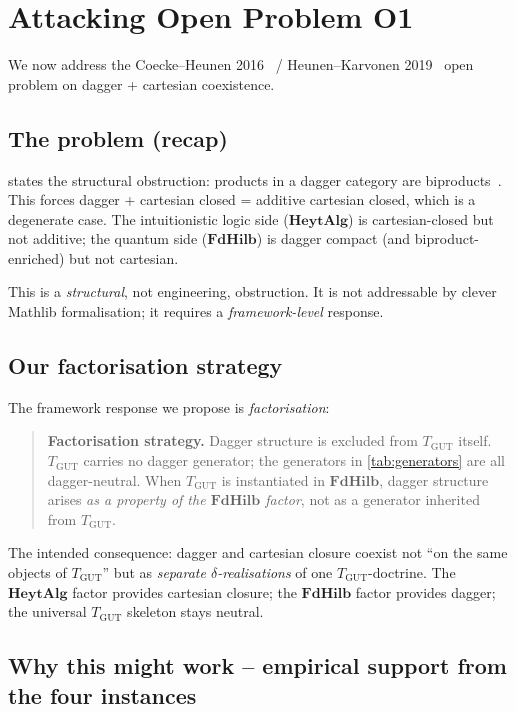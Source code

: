 \documentclass[11pt,a4paper]{article}
\theoremstyle{plain}
\theoremstyle{definition}
\theoremstyle{remark}
\newcommand{\cat}[1]{\mathbf{#1}}
\newcommand{\HeytAlg}{\cat{HeytAlg}}
\newcommand{\FdHilb}{\cat{FdHilb}}
\newcommand{\TGUT}{T_{\mathrm{GUT}}}
\begin{document}
\section{Attacking Open Problem O1}\label{sec:o1}

We now address the Coecke--Heunen 2016~\cite{CH16} / Heunen--Karvonen 2019~\cite{HK19} open problem on dagger + cartesian coexistence.

\subsection{The problem (recap)}\label{sec:o1:problem}

 states the structural obstruction: products in a dagger category are biproducts~\cite[Theorem 3.4]{HK19}. This forces dagger + cartesian closed = additive cartesian closed, which is a degenerate case. The intuitionistic logic side ($\HeytAlg$) is cartesian-closed but not additive; the quantum side ($\FdHilb$) is dagger compact (and biproduct-enriched) but not cartesian.

This is a \emph{structural}, not engineering, obstruction. It is not addressable by clever Mathlib formalisation; it requires a \emph{framework-level} response.

\subsection{Our factorisation strategy}\label{sec:o1:fact}

The framework response we propose is \emph{factorisation}:

\begin{quote}
\textbf{Factorisation strategy.} Dagger structure is excluded from $\TGUT$ itself. $\TGUT$ carries no dagger generator; the generators in \cref{tab:generators} are all dagger-neutral. When $\TGUT$ is instantiated in $\FdHilb$, dagger structure arises \emph{as a property of the $\FdHilb$ factor}, not as a generator inherited from $\TGUT$.
\end{quote}

The intended consequence: dagger and cartesian closure coexist not ``on the same objects of $\TGUT$'' but as \emph{separate $\delta$-realisations} of one $\TGUT$-doctrine. The $\HeytAlg$ factor provides cartesian closure; the $\FdHilb$ factor provides dagger; the universal $\TGUT$ skeleton stays neutral.

\subsection{Why this might work -- empirical support from the four instances}\label{sec:o1:support}
\end{document}
